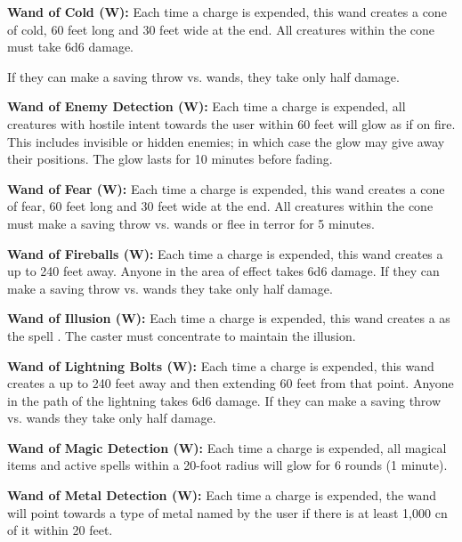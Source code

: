 \begin{multicols*}{2}
\textbf{Wand of Cold (W):} Each time a charge is expended, this wand creates a cone of cold, 60 feet long and 30 feet wide at the end. All creatures within the cone must take 6d6 damage.

If they can make a saving throw vs. wands, they take only half damage.

\textbf{Wand of Enemy Detection (W):} Each time a charge is expended, all creatures with hostile intent towards the user within 60 feet will glow as if on fire. This includes invisible or hidden enemies; in which case the glow may give away their positions. The glow lasts for 10 minutes before fading.

\textbf{Wand of Fear (W):} Each time a charge is expended, this wand creates a cone of fear, 60 feet long and 30 feet wide at the end. All creatures within the cone must make a saving throw vs. wands or flee in terror for 5 minutes.

\textbf{Wand of Fireballs (W):} Each time a charge is expended, this wand creates a  up to 240 feet away. Anyone in the area of effect takes 6d6 damage. If they can make a saving throw vs. wands they take only half damage.

\textbf{Wand of Illusion (W):} Each time a charge is expended, this wand creates a  as the spell . The caster must concentrate to maintain the illusion.

\textbf{Wand of Lightning Bolts (W):} Each time a charge is expended, this wand creates a  up to 240 feet away and then extending 60 feet from that point. Anyone in the path of the lightning takes 6d6 damage. If they can make a saving throw vs. wands they take only half damage.

\textbf{Wand of Magic Detection (W):} Each time a charge is expended, all magical items and active spells within a 20-foot radius will glow for 6 rounds (1 minute).

\textbf{Wand of Metal Detection (W):} Each time a charge is expended, the wand will point towards a type of metal named by the user if there is at least 1,000 cn of it within 20 feet.


\end{multicols*}
